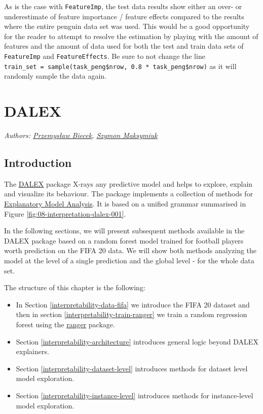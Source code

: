 \documentclass[
]{scrbook}
\providecommand{\tightlist}{%
  \setlength{\itemsep}{0pt}\setlength{\parskip}{0pt}}
\begin{document}
As is the case with \texttt{FeatureImp}, the test data results show either an over- or underestimate of feature importance / feature effects compared to the results where the entire penguin data set was used.
This would be a good opportunity for the reader to attempt to resolve the estimation by playing with the amount of features and the amount of data used for both the test and train data sets of \texttt{FeatureImp} and \texttt{FeatureEffects}.
Be sure to not change the line \texttt{train\_set\ =\ sample(task\_peng\$nrow,\ 0.8\ *\ task\_peng\$nrow)} as it will randomly sample the data again.

\hypertarget{dalex}{%
\section{DALEX}\label{dalex}}

\emph{Authors: \href{https://github.com/pbiecek}{Przemysław Biecek}, \href{https://github.com/maksymiuks}{Szymon Maksymiuk}}

\hypertarget{interpretability-dalex-introduction}{%
\subsection{Introduction}\label{interpretability-dalex-introduction}}

The \href{https://cran.r-project.org/package=DALEX}{DALEX} package X-rays any predictive model and helps to explore, explain and visualize its behaviour. The package implements a collection of methods for \href{https://pbiecek.github.io/ema/}{Explanatory Model Analysis}. It is based on a unified grammar summarised in Figure \ref{fig:08-interpretation-dalex-001}.

In the following sections, we will present subsequent methods available in the DALEX package based on a random forest model trained for football players worth prediction on the FIFA 20 data. We will show both methods analyzing the model at the level of a single prediction and the global level - for the whole data set.

The structure of this chapter is the following:

\begin{itemize}
\tightlist
\item
  In Section \ref{interpretability-data-fifa} we introduce the FIFA 20 dataset and then in section \ref{interpretability-train-ranger} we train a random regression forest using the \href{https://cran.r-project.org/package=ranger}{ranger} package.
\item
  Section \ref{interpretability-architecture} introduces general logic beyond DALEX explainers.
\item
  Section \ref{interpretability-dataset-level} introduces methods for dataset level model exploration.
\item
  Section \ref{interpretability-instance-level} introduces methods for instance-level model exploration.
\end{itemize}
\end{document}
